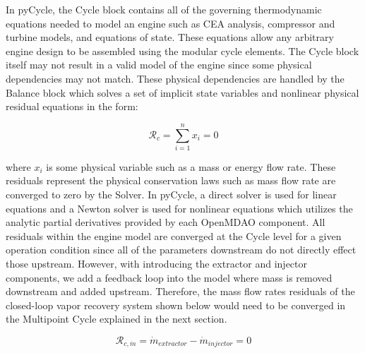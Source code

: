 \documentclass[conf]{new-aiaa}
\begin{document}
In pyCycle, the Cycle block contains all of the governing thermodynamic equations needed to model an engine such as CEA analysis, compressor and turbine models, and equations of state.
These equations allow any arbitrary engine design to be assembled using the modular cycle elements.
The Cycle block itself may not result in a valid model of the engine since some physical dependencies may not match.
These physical dependencies are handled by the Balance block which solves a set of implicit state variables and nonlinear physical residual equations in the form:

\begin{equation}
    \mathcal{R}_c = \sum_{i=1}^{n} x_i = 0
\end{equation}

\noindent
where $x_i$ is some physical variable such as a mass or energy flow rate.
These residuals represent the physical conservation laws such as mass flow rate are converged to zero by the Solver.
In pyCycle, a direct solver is used for linear equations and a Newton solver is used for nonlinear equations which utilizes the analytic partial derivatives provided by each OpenMDAO component.
All residuals within the engine model are converged at the Cycle level for a given operation condition since all of the parameters downstream do not directly effect those upstream.
However, with introducing the extractor and injector components, we add a feedback loop into the model where mass is removed downstream and added upstream.
Therefore, the mass flow rates residuals of the closed-loop vapor recovery system shown below would need to be converged in the Multipoint Cycle explained in the next section.

\begin{equation}
    \mathcal{R}_{c,\dot{m}} = \dot{m}_{extractor} - \dot{m}_{injector} = 0
\end{equation}
\end{document}
